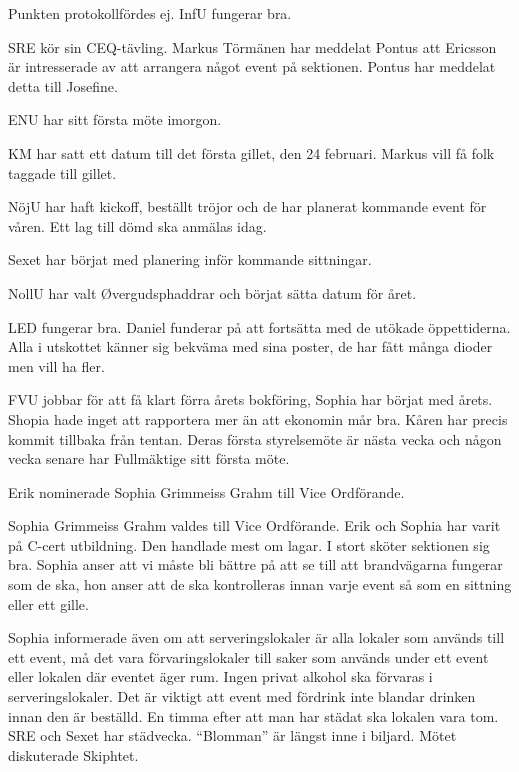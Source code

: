 \documentclass[10pt]{article}
\begin{document}
\begin{paragrafer}
\begin{paragrafer}
Punkten protokollfördes ej.
InfU fungerar bra.

SRE kör sin CEQ-tävling. Markus Törmänen har meddelat Pontus att Ericsson är intresserade av att arrangera något event på sektionen. Pontus har meddelat detta till Josefine.

ENU har sitt första möte imorgon.

KM har satt ett datum till det första gillet, den 24 februari. Markus vill få folk taggade till gillet.

NöjU har haft kickoff, beställt tröjor och de har planerat kommande event för våren. Ett lag till dömd ska anmälas idag.

Sexet har börjat med planering inför kommande sittningar.

NollU har valt Øvergudsphaddrar och börjat sätta datum för året.

LED fungerar bra. Daniel funderar på att fortsätta med de utökade öppettiderna. Alla i utskottet känner sig bekväma med sina poster, de har fått många dioder men vill ha fler.

FVU jobbar för att få klart förra årets bokföring, Sophia har börjat med årets.
Shopia hade inget att rapportera mer än att ekonomin mår bra.
Kåren har precis kommit tillbaka från tentan. Deras första styrelsemöte är nästa vecka och någon vecka senare har Fullmäktige sitt första möte.
\end{paragrafer}

Erik nominerade Sophia Grimmeiss Grahm till Vice Ordförande.

Sophia Grimmeiss Grahm valdes till Vice Ordförande.
Erik och Sophia har varit på C-cert utbildning. Den handlade mest om lagar. I stort sköter sektionen sig bra. Sophia anser att vi måste bli bättre på att se till att brandvägarna fungerar som de ska, hon anser att de ska kontrolleras innan varje event så som en sittning eller ett gille.

Sophia informerade även om att serveringslokaler är alla lokaler som används till ett event, må det vara förvaringslokaler till saker som används under ett event eller lokalen där eventet äger rum. Ingen privat alkohol ska förvaras i serveringslokaler.
Det är viktigt att event med fördrink inte blandar drinken innan den är beställd. En timma efter att man har städat ska lokalen vara tom.
SRE och Sexet har städvecka.
``Blomman'' är längst inne i biljard.
Mötet diskuterade Skiphtet.


\end{paragrafer}
\end{document}
